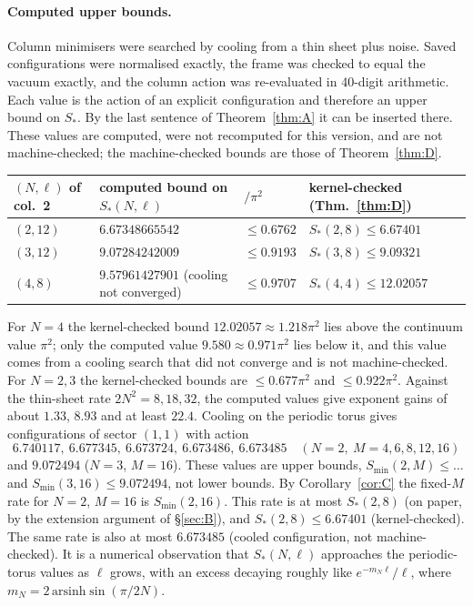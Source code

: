 \documentclass[11pt,a4paper]{article}
\theoremstyle{definition}
\theoremstyle{remark}
\begin{document}
\paragraph{Computed upper bounds.}
Column minimisers were searched by cooling from a thin sheet plus noise.
Saved configurations were normalised exactly, the frame was checked to equal the vacuum exactly, and the column action was re-evaluated in 40-digit arithmetic.
Each value is the action of an explicit configuration and therefore an upper bound on $S_*$.
By the last sentence of Theorem~\ref{thm:A} it can be inserted there.
These values are computed, were not recomputed for this version, and are not machine-checked; the machine-checked bounds are those of Theorem~\ref{thm:D}.
\begin{center}
\footnotesize\begin{tabular}{llll}\toprule
$(N,\ell)$ of col.~2 & computed bound on $S_*(N,\ell)$ & $/\pi^2$ & kernel-checked (Thm.~\ref{thm:D})\\\midrule
$(2,12)$ & $6.67348665542$ & $\le0.6762$ & $S_*(2,8)\le6.67401$\\
$(3,12)$ & $9.07284242009$ & $\le0.9193$ & $S_*(3,8)\le9.09321$\\
$(4,8)$ & $9.57961427901$ (cooling not converged) & $\le0.9707$ & $S_*(4,4)\le12.02057$\\\bottomrule
\end{tabular}
\end{center}
For $N=4$ the kernel-checked bound $12.02057\approx1.218\pi^2$ lies above the continuum value $\pi^2$; only the computed value $9.580\approx0.971\pi^2$ lies below it, and this value comes from a cooling search that did not converge and is not machine-checked.
For $N=2,3$ the kernel-checked bounds are $\le0.677\pi^2$ and $\le0.922\pi^2$.
Against the thin-sheet rate $2N^2=8,18,32$, the computed values give exponent gains of about $1.33$, $8.93$ and at least $22.4$.
Cooling on the periodic torus gives configurations of sector $(1,1)$ with action
\[ 6.740117,\ 6.677345,\ 6.673724,\ 6.673486,\ 6.673485\quad(N=2,\ M=4,6,8,12,16) \]
and $9.072494$ ($N=3$, $M=16$).
These values are upper bounds, $S_{\min}(2,M)\le\dots$ and $S_{\min}(3,16)\le9.072494$, not lower bounds.
By Corollary~\ref{cor:C} the fixed-$M$ rate for $N=2$, $M=16$ is $S_{\min}(2,16)$.
This rate is at most $S_*(2,8)$ (on paper, by the extension argument of \S\ref{sec:B}), and $S_*(2,8)\le6.67401$ (kernel-checked).
The same rate is also at most $6.673485$ (cooled configuration, not machine-checked).
It is a numerical observation that $S_*(N,\ell)$ approaches the periodic-torus values as $\ell$ grows, with an excess decaying roughly like $e^{-m_N\ell}/\ell$, where $m_N=2\,\mathrm{arsinh}\sin(\pi/2N)$.
\end{document}
